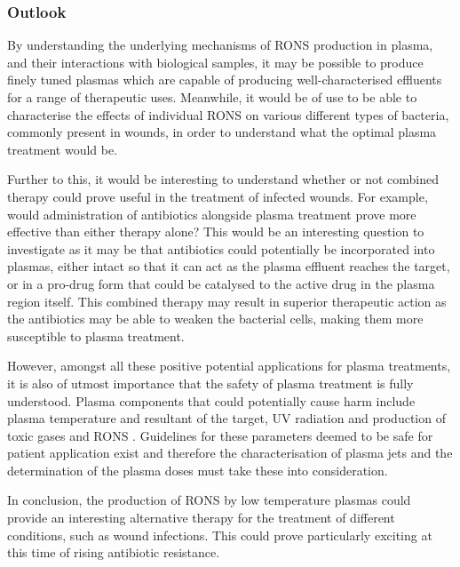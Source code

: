 \documentclass[11pt, oneside]{article}   	%
\begin{document}
\subsubsection{Outlook}

By understanding the underlying mechanisms of RONS production in plasma, and their interactions with biological samples, it may be possible to produce finely tuned plasmas which are capable of producing well-characterised effluents for a range of therapeutic uses.
Meanwhile, it would be of use to be able to characterise the effects of individual RONS on various different types of bacteria, commonly present in wounds, in order to understand what the optimal plasma treatment would be.

Further to this, it would be interesting to understand whether or not combined therapy could prove useful in the treatment of infected wounds. 
For example, would administration of antibiotics alongside plasma treatment prove more effective than either therapy alone?
This would be an interesting question to investigate as it may be that antibiotics could potentially be incorporated into plasmas, either intact so that it can act as the plasma effluent reaches the target, or in a pro-drug form that could be catalysed to the active drug in the plasma region itself.
This combined therapy may result in superior therapeutic action as the antibiotics may be able to weaken the bacterial cells, making them more susceptible to plasma treatment.

However, amongst all these positive potential applications for plasma treatments, it is also of utmost importance that the safety of plasma treatment is fully understood. 
Plasma components that could potentially cause harm include plasma temperature and resultant of the target, UV radiation and production of toxic gases and RONS \cite{Weltmann2009}.
Guidelines for these parameters deemed to be safe for patient application exist and therefore the characterisation of plasma jets and the determination of the plasma doses must take these into consideration.

In conclusion, the production of RONS by low temperature plasmas could provide an interesting alternative therapy for the treatment of different conditions, such as wound infections. This could prove particularly exciting at this time of rising antibiotic resistance.




\end{document}

